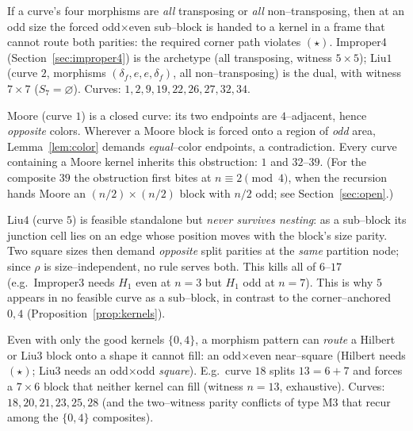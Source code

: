 \documentclass[11pt]{article}
\theoremstyle{definition}
\begin{document}
\begin{description}[leftmargin=1em]
\item[(M1) Homogeneous morphisms.] If a curve's four morphisms are \emph{all} transposing
or \emph{all} non--transposing, then at an odd size the forced odd$\times$even sub--block is
handed to a kernel in a frame that cannot route both parities: the required corner path
violates $(\star)$. Improper4 (Section~\ref{sec:improper4}) is the archetype (all
transposing, witness $5\times5$); Liu$1$ (curve $2$, morphisms $(\delta_f,e,e,\delta_f)$,
all non--transposing) is the dual, with witness $7\times7$ ($S_7=\varnothing$). Curves:
$1,2,9,19,22,26,27,32,34$.

\item[(M2) Near--cyclic Moore kernel.] Moore (curve $1$) is a closed curve: its two
endpoints are $4$--adjacent, hence \emph{opposite} colors. Wherever a Moore block is forced
onto a region of \emph{odd} area, Lemma~\ref{lem:color} demands \emph{equal}--color
endpoints, a contradiction. Every curve containing a Moore kernel inherits this obstruction:
$1$ and $32$--$39$. (For the composite $39$ the obstruction first bites at $n\equiv2\pmod4$,
when the recursion hands Moore an $(n/2)\times(n/2)$ block with $n/2$ odd; see
Section~\ref{sec:open}.)

\item[(M3) Edge--to--edge Liu$4$ drift.] Liu$4$ (curve $5$) is feasible standalone but
\emph{never survives nesting}: as a sub--block its junction cell lies on an edge whose
position moves with the block's size parity. Two square sizes then demand \emph{opposite}
split parities at the \emph{same} partition node; since $\rho$ is size--independent, no rule
serves both. This kills all of $6$--$17$ (e.g.\ Improper3 needs $H_1$ even at $n=3$ but
$H_1$ odd at $n=7$). This is why $5$ appears in no feasible curve as a sub--block, in
contrast to the corner--anchored $0,4$ (Proposition~\ref{prop:kernels}).

\item[(M4) Mis--routing of good kernels.] Even with only the good kernels $\{0,4\}$, a
morphism pattern can \emph{route} a Hilbert or Liu$3$ block onto a shape it cannot fill: an
odd$\times$even near--square (Hilbert needs $(\star)$; Liu$3$ needs an odd$\times$odd
\emph{square}). E.g.\ curve $18$ splits $13=6+7$ and forces a $7\times6$ block that neither
kernel can fill (witness $n=13$, exhaustive). Curves: $18,20,21,23,25,28$ (and the
two--witness parity conflicts of type M3 that recur among the $\{0,4\}$ composites).
\end{description}
\end{document}
